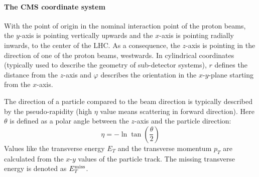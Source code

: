 \paragraph*{The \ac{CMS} coordinate system}\label{sec:coordinates}
With the point of origin in the nominal interaction point of the proton beams, the $y$-axis is pointing vertically upwards and the $x$-axis is pointing radially inwards, to the center of the \ac{LHC}. As a consequence, the $z$-axis is pointing in the direction of one of the proton beams, westwards. In cylindrical coordinates (typically used to describe the geometry of sub-detector systems), $r$ defines the distance from the $z$-axis and $\varphi$ describes the orientation in the $x$-$y$-plane starting from the $x$-axis. 

The direction of a particle compared to the beam direction is typically described by the pseudo-rapidity (high $\eta$ value means scattering in forward direction). Here $\theta$ is defined as a polar angle between the $z$-axis and the particle direction:
\begin{equation}
\eta =-\ln\tan\left(\frac{\theta}{2}\right)
\end{equation}
Values like the transverse energy $E_T$ and the transverse momentum $p_T$ are calculated from the $x$-$y$ values of the particle track. The missing transverse energy is denoted as $E^{\rm{miss}}_T$.


